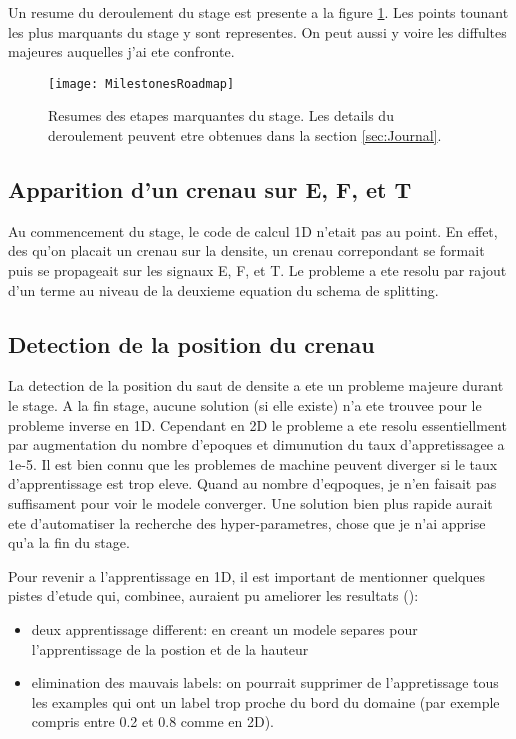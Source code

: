 Un resume du deroulement du stage est presente a la figure \ref{fig:MilestonesRoadmap}. Les points tounant les plus marquants du stage y sont representes. On peut aussi y voire les diffultes majeures auquelles j'ai ete confronte.

\begin{figure}[H] 
\centering
\texttt{[image: MilestonesRoadmap]} 
\decoRule
\caption[MilestonesRoadmap]{Resumes des etapes marquantes du stage. Les details du deroulement peuvent etre obtenues dans la section \ref{sec:Journal}.}
\label{fig:MilestonesRoadmap}
\end{figure}

\subsection{Apparition d'un crenau sur E, F, et T}
Au commencement du stage, le code de calcul 1D n'etait pas au point. En effet, des qu'on placait un crenau sur la densite, un crenau correpondant se formait puis se propageait sur les signaux E, F, et T. Le probleme a ete resolu par rajout d'un terme au niveau de la deuxieme equation du schema de splitting.

\subsection{Detection de la position du crenau}
La detection de la position du saut de densite a ete un probleme majeure durant le stage. A la fin stage, aucune solution (si elle existe) n'a ete trouvee pour le probleme inverse en 1D. 
Cependant en 2D le probleme a ete resolu essentiellment par augmentation du nombre d'epoques et dimunution du taux d'appretissagee a 1e-5. Il est bien connu que les problemes de machine peuvent diverger si le taux d'apprentissage est trop eleve. Quand au nombre d'eqpoques, je n'en faisait pas suffisament pour voir le modele converger. Une solution bien plus rapide aurait ete d'automatiser la recherche des hyper-parametres, chose que je n'ai apprise qu'a la fin du stage.

Pour revenir a l'apprentissage en 1D, il est important de mentionner quelques pistes d'etude qui, combinee, auraient pu ameliorer les resultats ():
\begin{itemize}
    \item deux apprentissage different: en creant un modele separes pour l'apprentissage de la postion  et de la hauteur
    \item elimination des mauvais labels: on pourrait supprimer de l'appretissage tous les examples qui ont un label trop proche du bord du domaine (par exemple compris entre 0.2 et 0.8 comme en 2D).
\end{itemize}

